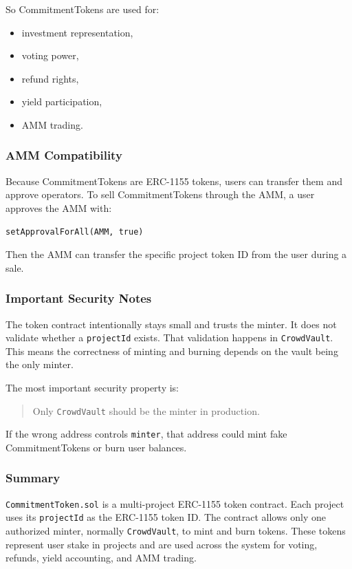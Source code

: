 \documentclass[11pt,a4paper]{article}
\begin{document}
So CommitmentTokens are used for:

\begin{itemize}
  \item investment representation,
  \item voting power,
  \item refund rights,
  \item yield participation,
  \item AMM trading.
\end{itemize}

\subsubsection{AMM Compatibility}

Because CommitmentTokens are ERC-1155 tokens, users can transfer them and approve operators. To sell CommitmentTokens through the AMM, a user approves the AMM with:

\begin{lstlisting}
setApprovalForAll(AMM, true)
\end{lstlisting}

Then the AMM can transfer the specific project token ID from the user during a sale.

\subsubsection{Important Security Notes}

The token contract intentionally stays small and trusts the minter. It does not validate whether a \texttt{projectId} exists. That validation happens in \texttt{CrowdVault}. This means the correctness of minting and burning depends on the vault being the only minter.

The most important security property is:

\begin{quote}
Only \texttt{CrowdVault} should be the minter in production.
\end{quote}

If the wrong address controls \texttt{minter}, that address could mint fake CommitmentTokens or burn user balances.

\subsubsection{Summary}

\texttt{CommitmentToken.sol} is a multi-project ERC-1155 token contract. Each project uses its \texttt{projectId} as the ERC-1155 token ID. The contract allows only one authorized minter, normally \texttt{CrowdVault}, to mint and burn tokens. These tokens represent user stake in projects and are used across the system for voting, refunds, yield accounting, and AMM trading.
\end{document}

